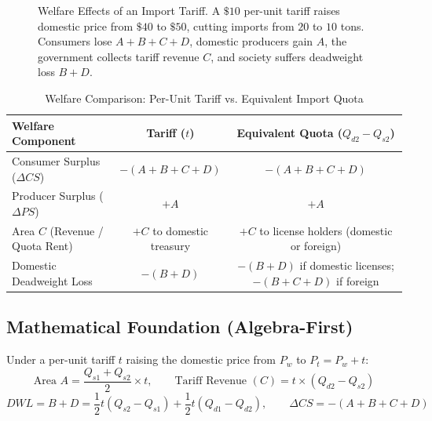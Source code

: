 \documentclass[11pt,letterpaper]{article}
\begin{document}
\begin{figure}[htbp]
\caption{Welfare Effects of an Import Tariff. A $\$10$ per-unit tariff raises domestic price from $\$40$ to $\$50$, cutting imports from $20$ to $10$ tons. Consumers lose $A+B+C+D$, domestic producers gain $A$, the government collects tariff revenue $C$, and society suffers deadweight loss $B+D$.}
\label{fig:tariff_welfare}
\end{figure}

\begin{table}[htbp]
\centering
\caption{Welfare Comparison: Per-Unit Tariff vs. Equivalent Import Quota}
\label{tab:tariff_vs_quota}
\begin{tabular}{lcc}
\toprule
\textbf{Welfare Component} & \textbf{Tariff ($t$)} & \textbf{Equivalent Quota ($Q_{d2} - Q_{s2}$)} \\
\midrule
Consumer Surplus ($\Delta CS$) & $-(A + B + C + D)$ & $-(A + B + C + D)$ \\
Producer Surplus ($\Delta PS$) & $+A$ & $+A$ \\
Area $C$ (Revenue / Quota Rent) & $+C$ to domestic treasury & $+C$ to license holders (domestic or foreign) \\
Domestic Deadweight Loss & $-(B + D)$ & $-(B + D)$ if domestic licenses; $-(B + C + D)$ if foreign \\
\bottomrule
\end{tabular}
\end{table}

\subsection*{Mathematical Foundation (Algebra-First)}
Under a per-unit tariff $t$ raising the domestic price from $P_w$ to $P_t = P_w + t$:
\begin{equation}
\text{Area } A = \frac{Q_{s1} + Q_{s2}}{2} \times t, \qquad \text{Tariff Revenue } (C) = t \times (Q_{d2} - Q_{s2})
\end{equation}
\begin{equation}
DWL = B + D = \frac{1}{2} t (Q_{s2} - Q_{s1}) + \frac{1}{2} t (Q_{d1} - Q_{d2}), \qquad \Delta CS = -(A + B + C + D)
\end{equation}
\end{document}
